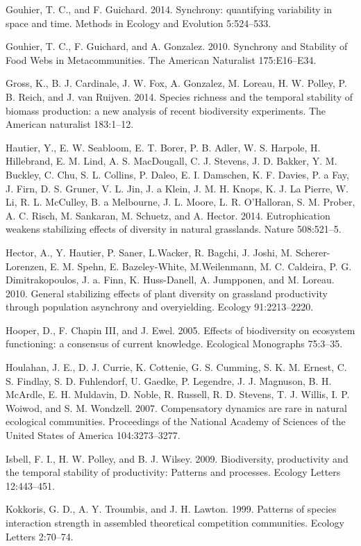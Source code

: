 \documentclass[12pt,]{article}
\begin{document}
Gouhier, T. C., and F. Guichard. 2014. Synchrony: quantifying
variability in space and time. Methods in Ecology and Evolution
5:524--533.

Gouhier, T. C., F. Guichard, and A. Gonzalez. 2010. Synchrony and
Stability of Food Webs in Metacommunities. The American Naturalist
175:E16--E34.

Gross, K., B. J. Cardinale, J. W. Fox, A. Gonzalez, M. Loreau, H. W.
Polley, P. B. Reich, and J. van Ruijven. 2014. Species richness and the
temporal stability of biomass production: a new analysis of recent
biodiversity experiments. The American naturalist 183:1--12.

Hautier, Y., E. W. Seabloom, E. T. Borer, P. B. Adler, W. S. Harpole, H.
Hillebrand, E. M. Lind, A. S. MacDougall, C. J. Stevens, J. D. Bakker,
Y. M. Buckley, C. Chu, S. L. Collins, P. Daleo, E. I. Damschen, K. F.
Davies, P. a Fay, J. Firn, D. S. Gruner, V. L. Jin, J. a Klein, J. M. H.
Knops, K. J. {La Pierre}, W. Li, R. L. McCulley, B. a Melbourne, J. L.
Moore, L. R. O'Halloran, S. M. Prober, A. C. Risch, M. Sankaran, M.
Schuetz, and A. Hector. 2014. Eutrophication weakens stabilizing effects
of diversity in natural grasslands. Nature 508:521--5.

Hector, A., Y. Hautier, P. Saner, L.Wacker, R. Bagchi, J. Joshi, M.
Scherer-Lorenzen, E. M. Spehn, E. Bazeley-White, M.Weilenmann, M. C.
Caldeira, P. G. Dimitrakopoulos, J. a. Finn, K. Huss-Danell, A.
Jumpponen, and M. Loreau. 2010. General stabilizing effects of plant
diversity on grassland productivity through population asynchrony and
overyielding. Ecology 91:2213--2220.

Hooper, D., F. {Chapin III}, and J. Ewel. 2005. Effects of biodiversity
on ecosystem functioning: a consensus of current knowledge. Ecological
Monographs 75:3--35.

Houlahan, J. E., D. J. Currie, K. Cottenie, G. S. Cumming, S. K. M.
Ernest, C. S. Findlay, S. D. Fuhlendorf, U. Gaedke, P. Legendre, J. J.
Magnuson, B. H. McArdle, E. H. Muldavin, D. Noble, R. Russell, R. D.
Stevens, T. J. Willis, I. P. Woiwod, and S. M. Wondzell. 2007.
Compensatory dynamics are rare in natural ecological communities.
Proceedings of the National Academy of Sciences of the United States of
America 104:3273--3277.

Isbell, F. I., H. W. Polley, and B. J. Wilsey. 2009. Biodiversity,
productivity and the temporal stability of productivity: Patterns and
processes. Ecology Letters 12:443--451.

Kokkoris, G. D., A. Y. Troumbis, and J. H. Lawton. 1999. Patterns of
species interaction strength in assembled theoretical competition
communities. Ecology Letters 2:70--74.
\end{document}

